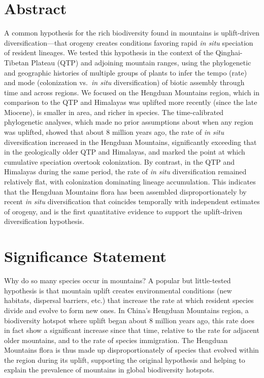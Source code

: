 \section*{Abstract}

A common hypothesis for the rich biodiversity found in mountains is
uplift-driven diversification---that orogeny creates conditions
favoring rapid \textit{in situ} speciation of resident lineages. We
tested this hypothesis in the context of the Qinghai-Tibetan Plateau
(QTP) and adjoining mountain ranges, using the phylogenetic and
geographic histories of multiple groups of plants to infer the tempo
(rate) and mode (colonization vs.\ \textit{in situ} diversification)
of biotic assembly through time and across regions. We focused on the
Hengduan Mountains region, which in comparison to the QTP and
Himalayas was uplifted more recently (since the late Miocene), is
smaller in area, and richer in species. The time-calibrated
phylogenetic analyses, which made no prior assumptions about when any
region was uplifted, showed that about 8 million years ago, the rate
of \textit{in situ} diversification increased in the Hengduan
Mountains, significantly exceeding that in the geologically older QTP
and Himalayas, and marked the point at which cumulative speciation
overtook colonization. By contrast, in the QTP and Himalayas during
the same period, the rate of \textit{in situ} diversification remained
relatively flat, with colonization dominating lineage
accumulation. This indicates that the Hengduan Mountains flora has
been assembled disproportionately by recent \textit{in situ}
diversification that coincides temporally with independent estimates
of orogeny, and is the first quantitative evidence to support the
uplift-driven diversification hypothesis.

\newpage

\section*{Significance Statement}

Why do so many species occur in mountains? A popular but little-tested
hypothesis is that mountain uplift creates environmental conditions
(new habitats, dispersal barriers, etc.) that increase the rate at
which resident species divide and evolve to form new ones. In China's
Hengduan Mountains region, a biodiversity hotspot where uplift began
about 8 million years ago, this rate does in fact show a significant
increase since that time, relative to the rate for adjacent older
mountains, and to the rate of species immigration. The Hengduan
Mountains flora is thus made up disproportionately of species that
evolved within the region during its uplift, supporting the original
hypothesis and helping to explain the prevalence of mountains in
global biodiversity hotspots.



